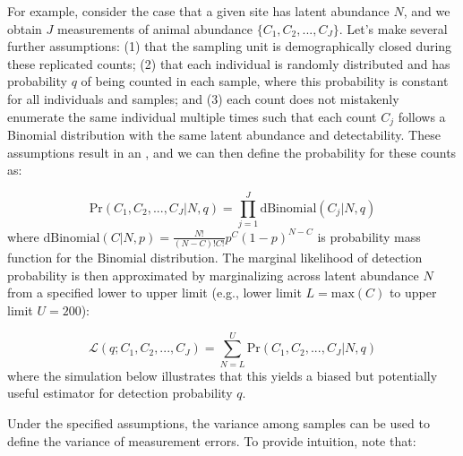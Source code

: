 For example, consider the case that a given site has latent abundance \(N\), and we obtain \(J\) measurements of animal abundance \( \{ C_1, C_2, ..., C_J \} \).  Let's make several further assumptions:  (1) that the sampling unit is demographically closed during these replicated counts; (2) that each individual is randomly distributed and has probability \(q\) of being counted in each sample, where this probability is constant for all individuals and samples; and (3) each count does not mistakenly enumerate the same individual multiple times such that each count \(C_j\) follows a Binomial distribution with the same latent abundance and detectability.  These assumptions result in an  \cite{royle_n-mixture_2004}, and we can then define the probability for these counts as:

\begin{equation} \label{eq:Chap6_Nmixture}
    \mathrm{Pr}( C_1, C_2, ..., C_J | N, q ) = \prod_{j=1}^J \mathrm{dBinomial}( C_j | N, q )
\end{equation}
where \(\mathrm{dBinomial}(C|N,p) = \frac{N!}{(N-C)!C!} p^C (1-p)^{N-C} \) is probability mass function for the Binomial distribution.  The marginal likelihood of detection probability is then approximated by marginalizing across latent abundance \(N\) from a specified lower to upper limit (e.g., lower limit \(L=\mathrm{max}(C)\) to upper limit \(U=200\)):

\begin{equation}
    \mathcal{L}( q; C_1, C_2, ..., C_J ) = \sum_{N=L}^{U} \mathrm{Pr}( C_1, C_2, ..., C_J | N, q )
\end{equation}
where the simulation below illustrates that this yields a biased but potentially useful estimator for detection probability \(q\).  

\lstset{style=Rcode}


Under the specified assumptions, the variance among samples can be used to define the variance of measurement errors.  To provide intuition, note that:

